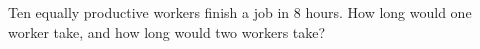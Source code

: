 Ten equally productive workers finish a job in $8$ hours. How long would one worker take, and how long would two workers take?
